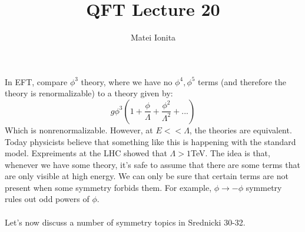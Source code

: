 \documentclass[12 pt]{article}
\title{QFT Lecture 20}
\author{Matei Ionita}
\begin{document}
  \maketitle

In EFT, compare $\phi^3$ theory, where we have no $\phi^4, \phi^5$ terms (and therefore the theory is renormalizable) to a theory given by:
\[        g\phi^3 \left( 1 + \frac{\phi}{\Lambda} + \frac{\phi^2}{\Lambda^2} + ...  \right)      \]
Which is nonrenormalizable. However, at $E<<\Lambda$, the theories are equivalent. Today physicists believe that something like this is happening with the standard model. Expreiments at the LHC showed that $\Lambda > 1$TeV. The idea is that, whenever we have some theory, it's safe to assume that there are some terms that are only visible at high energy. We can only be sure that certain terms are not present when some symmetry forbids them. For example, $\phi \to -\phi$ symmetry rules out odd powers of $\phi$.
\\
\\
Let's now discuss a number of symmetry topics in Srednicki 30-32.
\end{document}
